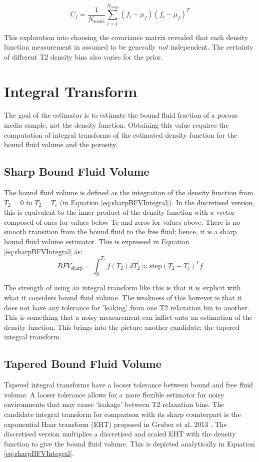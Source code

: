 \begin{equation}
    \label{eq:nonuniform_dependent_covar}
    C_f = \frac{1}{N_\text{rocks}} \sum^{N_\text{rocks}}_{i = 1} (f_i - \mu_f) (f_i - \mu_f)^T
\end{equation}

This exploration into choosing the covariance matrix revealed that each density function measurement in assumed to be generally \textit{not} independent. The certainty of different T2 density bins also varies for the prior.


\section{Integral Transform}
The goal of the estimator is to estimate the bound fluid fraction of a porous media sample, not the density function. Obtaining this value requires the computation of integral transforms of the estimated density function for the bound fluid volume and the porosity.

\subsection{Sharp Bound Fluid Volume}
The bound fluid volume is defined as the integration of the density function from $T_2=0$ to $T_2=T_c$ (in Equation \ref{eq:sharpBFVIntegral}). In the discretised version, this is equivalent to the inner product of the density function with a vector composed of ones for values below Tc and zeros for values above. There is no smooth transition from the bound fluid to the free fluid; hence, it is a sharp bound fluid volume estimator. This is expressed in Equation \ref{eq:sharpBFVIntegral}
 as:
\begin{equation}
    \label{eq:sharpBFVIntegral}
    BFV_{\text{sharp}} = \int^{T_c}_{0} f(T_2) d T_2 \approx \text{step}(T_2 - T_c)^T f
\end{equation}

The strength of using an integral transform like this is that it is explicit with what it considers bound fluid volume. The weakness of this however is that it does not have any tolerance for 'leaking' from one T2 relaxation bin to another. This is something that a noisy measurement can inflict onto an estimation of the density function. This brings into the picture another candidate; the tapered integral transform.


\subsection{Tapered Bound Fluid Volume}
Tapered integral transforms have a looser tolerance between bound and free fluid volume. A looser tolerance allows for a more flexible estimator for noisy environments that may cause ‘leakage’ between T2 relaxation bins. The candidate integral transform for comparison with its sharp counterpart is the exponential Haar transform (EHT) proposed in Gruber et al. 2013 \cite{GruberLinearFunctionals2013}. The discretised version multiplies a discretised and scaled EHT with the density function to give the bound fluid volume. This is depicted analytically in Equation \ref{eq:sharpBFVIntegral}.

